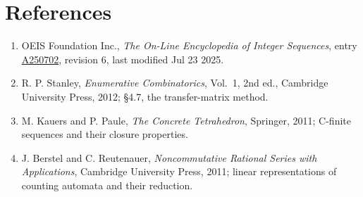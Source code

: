 \documentclass[11pt]{article}
\theoremstyle{definition}
\begin{document}
\section{References}

\begin{enumerate}

\item OEIS Foundation Inc., \emph{The On-Line Encyclopedia of Integer Sequences}, entry \href{https://oeis.org/A250702}{A250702}, revision 6, last modified Jul 23 2025.

\item R. P. Stanley, \emph{Enumerative Combinatorics}, Vol.~1, 2nd ed., Cambridge University Press, 2012; \S4.7, the transfer-matrix method.

\item M. Kauers and P. Paule, \emph{The Concrete Tetrahedron}, Springer, 2011; C-finite sequences and their closure properties.

\item J. Berstel and C. Reutenauer, \emph{Noncommutative Rational Series with Applications}, Cambridge University Press, 2011; linear representations of counting automata and their reduction.

\end{enumerate}
\end{document}
